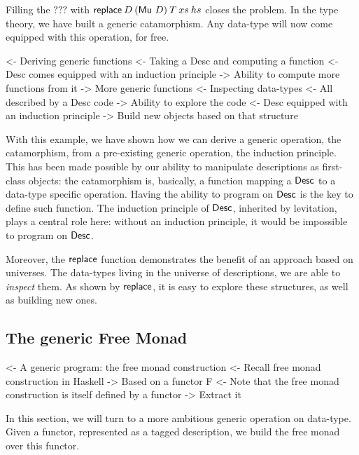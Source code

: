 Filling the \(???\) with \(\F{replace}\: D\: (\Mu{D})\: T\: xs\: hs\) closes the
problem. In the type theory, we have built a generic catamorphism. Any
data-type will now come equipped with this operation, for free.

\begin{wstructure}
<- Deriving generic functions
    <- Taking a Desc and computing a function
        <- Desc comes equipped with an induction principle
        -> Ability to compute more functions from it
            -> More generic functions
    <- Inspecting data-types
        <- All described by a Desc code
        -> Ability to explore the code
            <- Desc equipped with an induction principle
            -> Build new objects based on that structure
\end{wstructure}

With this example, we have shown how we can derive a generic
operation, the catamorphism, from a pre-existing generic operation,
the induction principle. This has been made possible by our ability to
manipulate descriptions as first-class objects: the catamorphism is,
basically, a function mapping a $\Desc$ to a data-type specific
operation. Having the ability to program on $\Desc$ is the key to
define such function. The induction principle of $\Desc$, inherited by
levitation, plays a central role here: without an induction principle,
it would be impossible to program on $\Desc$.

Moreover, the $\F{replace}$ function demonstrates the benefit of an
approach based on universes. The data-types living in the universe of
descriptions, we are able to \emph{inspect} them. As shown by
$\F{replace}$, it is easy to explore these structures, as well as
building new ones.

\subsection{The generic Free Monad}
\label{sec:desc-free-monad}

\begin{wstructure}
<- A generic program: the free monad construction
    <- Recall free monad construction in Haskell
        -> Based on a functor F
    <- Note that the free monad construction is itself defined by a functor
        -> Extract it
\end{wstructure}

In this section, we will turn to a more ambitious generic operation on
data-type. Given a functor, represented as a tagged description, we
build the free monad over this functor.

